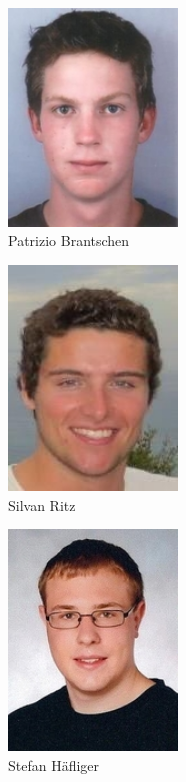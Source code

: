 \begin{figure}[H]
	\includegraphics[width=0.4\textwidth]{./04_Projektmanagement/fig/patriziobrantschen.jpg}
	\caption{Patrizio Brantschen}
\end{figure}

\begin{figure}[H]
	\includegraphics[width=0.4\textwidth]{./04_Projektmanagement/fig/silvanritz.jpg}
	\caption{Silvan Ritz}
\end{figure}

\begin{figure}[H]
	\includegraphics[width=0.4\textwidth]{./04_Projektmanagement/fig/stefanhaefliger.jpg}
	\caption{Stefan Häfliger}
\end{figure}

